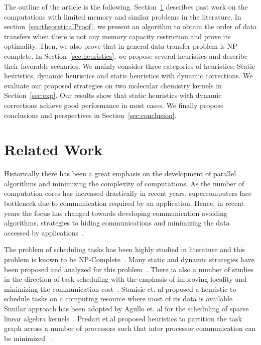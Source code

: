 \documentclass[runningheads]{llncs} %
\begin{document}
The outline of the article is the following. Section~\ref{sec:relatedWork} describes past work on the computations with limited memory and similar problems in the literature. In section~\ref{sec:theoreticalProof}, we present an algorithm to obtain the order of data transfers when there is not any memory capacity restriction and prove its optimality. Then, we also prove that in general data transfer problem is NP-complete. In Section~\ref{sec:heuristics}, we propose several heuristics and describe their favorable scenarios. We mainly consider three categories of heuristics: Static heuristics, dynamic heuristics and static heuristics with dynamic corrections. We evaluate our proposed strategies on two molecular chemistry kernels in Section~\ref{sec:exp}.  Our results show that static heuristics with dynamic corrections achieve good performance in most cases. We finally  propose conclusions and perspectives in Section~\ref{sec:conclusion}.

\section{Related Work}
\label{sec:relatedWork}

Historically there has been a great emphasis on the development of parallel algorithms and minimizing the complexity of computations. As the number of computation cores has increased drastically in recent years, supercomputers face bottleneck due to communication required by an application. Hence, in recent years the focus has changed towards developing communication avoiding algorithms, strategies to hiding communications and  minimizing the data accessed by applications~\cite{yelick2016}. 

  
The problem of scheduling tasks has been highly studied in literature and this problem is known to be NP-Complete~\cite{GareyJohnson}.  Many static and dynamic strategies have been proposed and analyzed for this problem~\cite{heft-Topcuoglu,hipc16multiresource,ipdps16starpu}. There ia also a number of studies in the direction of task scheduling with the emphasis of improving locality and minimizing the communication cost~\cite{starpu,heft-Topcuoglu}. Stanisic et. al proposed a heuristic to schedule tasks on a computing resource where most of its data is available~\cite{luka-dmdar}. Similar approach has been adopted by Agullo et. al for the scheduling of sparse linear algebra kernels~\cite{agullo_fmm}.  Predari et.al  proposed  heuristics to  partition the task graph across a number of processors such that inter processor communication can be minimized ~\cite{predari:tel-01518956}.
\end{document}
